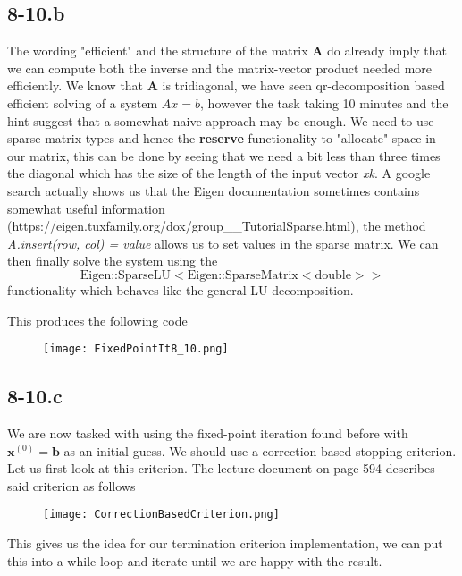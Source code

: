 \documentclass{article}
\begin{document}
\subsection*{8-10.b}
The wording "efficient" and the structure of the matrix $\mathbf{A}$ do already imply that we can compute both the inverse and the matrix-vector product needed more efficiently. We know that $\mathbf{A}$ is tridiagonal, we have seen qr-decomposition based efficient solving of a system $Ax = b$, however the task taking 10 minutes and the hint suggest that a somewhat naive approach may be enough. We need to use sparse matrix types and hence the \textbf{reserve} functionality to "allocate" space in our matrix, this can be done by seeing that we need a bit less than three times the diagonal which has the size of the length of the input vector \textit{xk}. A google search actually shows us that the Eigen documentation sometimes contains somewhat useful information (https://eigen.tuxfamily.org/dox/group\_\_TutorialSparse.html), the method \textit{A.insert(row, col) = value} allows us to set values in the sparse matrix. We can then finally solve the system using the 
\begin{equation*}
  \text{Eigen::SparseLU}<\text{Eigen::SparseMatrix}<\text{double}>>  
\end{equation*}
functionality which behaves like the general LU decomposition.

\pagebreak

This produces the following code

\begin{figure}[!hbt]
    \centering
    \texttt{[image: FixedPointIt8\_10.png]}
\end{figure}

\subsection*{8-10.c}
We are now tasked with using the fixed-point iteration found before with $\mathbf{x}^{\left(0\right)} = \mathbf{b}$ as an initial guess. We should use a correction based stopping criterion. Let us first look at this criterion. The lecture document on page 594 describes said criterion as follows

\begin{figure}[!hbt]
    \centering
    \texttt{[image: CorrectionBasedCriterion.png]}
\end{figure}


\noindent This gives us the idea for our termination criterion implementation, we can put this into a while loop and iterate until we are happy with the result. 
\end{document}
